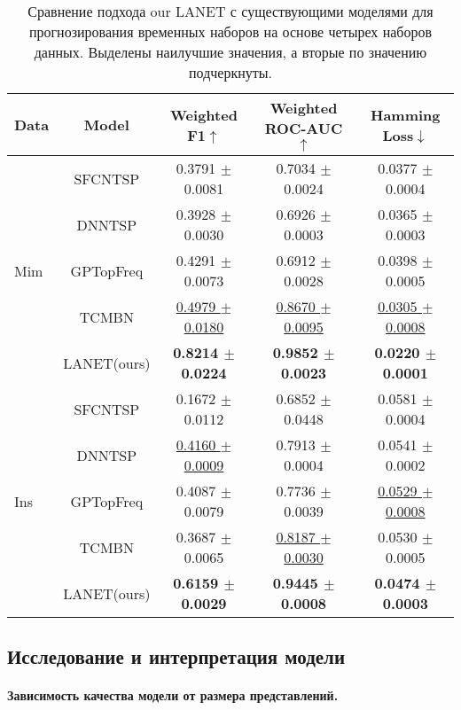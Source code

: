 \documentclass[a4paper, 12pt]{article} %
\begin{document}
\begin{table}[ht!] 
\caption{Сравнение подхода our LANET с существующими моделями для прогнозирования временных наборов на основе четырех наборов данных. Выделены наилучшие значения, а вторые по значению подчеркнуты.}
\small
\begin{tabular}{p{0.55cm}cccc}
    \hline
    Data & Model &Weighted F1$\uparrow$ & Weighted ROC-AUC$\uparrow$ & Hamming Loss$\downarrow$\\ \hline 
    \multirow{5}{*}{Mim} 
    & SFCNTSP & 0.3791 $\pm$ 0.0081 & 0.7034 $\pm$ 0.0024 & 0.0377 $\pm$ 0.0004 \\
    & DNNTSP &  0.3928 $\pm$ 0.0030 & 0.6926 $\pm$ 0.0003 & 0.0365 $\pm$ 0.0003\\ 
    & GPTopFreq &  0.4291 $\pm$ 0.0073 & 0.6912 $\pm$ 0.0028 & 0.0398 $\pm$ 0.0005 \\
    & TCMBN &  \underline{0.4979 $\pm$ 0.0180} & \underline{0.8670 $\pm$ 0.0095} & \underline{0.0305 $\pm$ 0.0008} \\ 
    & LANET(ours) &  \textbf{0.8214 $\pm$ 0.0224}   & \textbf{0.9852 $\pm$ 0.0023} & \textbf{0.0220 $\pm$ 0.0001} \\\hline 
    \multirow{5}{*}{Ins}
    & SFCNTSP &  0.1672 $\pm$ 0.0112 & 0.6852 $\pm$ 0.0448 & 0.0581 $\pm$ 0.0004 \\
    & DNNTSP &  \underline{0.4160 $\pm$ 0.0009} & 0.7913 $\pm$ 0.0004 & 0.0541 $\pm$ 0.0002 \\ 
    & GPTopFreq &  0.4087 $\pm$ 0.0079 & 0.7736 $\pm$ 0.0039 & \underline{0.0529 $\pm$ 0.0008}  \\
    & TCMBN &  0.3687 $\pm$ 0.0065 & \underline{0.8187 $\pm$ 0.0030} & 0.0530 $\pm$ 0.0005 \\ 
    & LANET(ours) &\textbf{0.6159 $\pm$ 0.0029}  & \textbf{0.9445 $\pm$ 0.0008} & \textbf{0.0474 $\pm$ 0.0003}\\ \hline
    \end{tabular}
\centering
\label{table:diff_data}
\end{table} 

\subsection{Исследование и интерпретация модели}  

\paragraph{\textbf{Зависимость качества модели от размера представлений.}}
\end{document}
